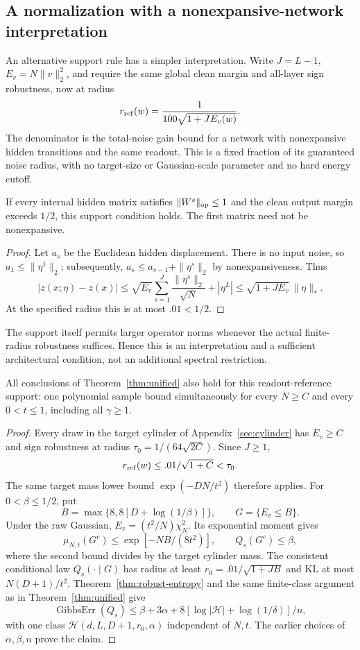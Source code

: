 \subsection{A normalization with a nonexpansive-network interpretation}
\label{sec:readout-reference}

An alternative support rule has a simpler interpretation. Write $J=L-1$,
$E_v=N\|v\|_2^2$, and require the same global clean margin and all-layer
sign robustness, now at radius
\[
 r_{\rm ref}(w)=\frac{1}{100\sqrt{1+J E_v(w)}}.
\]
The denominator is the total-noise gain bound for a network with
nonexpansive hidden transitions and the same readout. This is a fixed
fraction of its guaranteed noise radius, with no target-size or Gaussian-scale
parameter and no hard energy cutoff.

\begin{proposition}\label{prop:nonexpansive-reference}
If every internal hidden matrix satisfies $\|W^s\|_{\mathrm{op}}\le1$ and the
clean output margin exceeds $1/2$, this support condition holds.
The first matrix need not be nonexpansive.
\end{proposition}
\begin{proof}
Let $a_s$ be the Euclidean hidden displacement. There is no input noise,
so $a_1\le\|\eta^1\|_2$; subsequently,
$a_s\le a_{s-1}+\|\eta^s\|_2$ by nonexpansiveness. Thus
\[
 |z(x;\eta)-z(x)|
 \le\sqrt{E_v}\sum_{s=1}^J\frac{\|\eta^s\|_2}{\sqrt N}+|\eta^L|
 \le\sqrt{1+JE_v}\,\|\eta\|_*.
\]
At the specified radius this is at most $.01<1/2$.
\end{proof}

The support itself permits larger operator norms whenever the actual
finite-radius robustness suffices. Hence this is an interpretation and a
sufficient architectural condition, not an additional spectral restriction.

\begin{corollary}\label{cor:readout-reference}
All conclusions of Theorem~\ref{thm:unified} also hold for this
readout-reference support: one polynomial sample bound simultaneously for
every $N\ge C$ and every $0<t\le1$, including all $\gamma\ge1$.
\end{corollary}
\begin{proof}
Every draw in the target cylinder of Appendix~\ref{sec:cylinder} has
$E_v\ge C$ and sign robustness at radius $\tau_0=1/(64\sqrt{2C})$.
Since $J\ge1$,
\[
 r_{\rm ref}(w)\le .01/\sqrt{1+C}<\tau_0.
\]
The same target mass lower bound $\exp(-DN/t^2)$ therefore applies.
For $0<\beta\le1/2$, put
\[
 B=\max\{8,8[D+\log(1/\beta)]\},\qquad G=\{E_v\le B\}.
\]
Under the raw Gaussian, $E_v=(t^2/N)\chi_N^2$. Its exponential moment gives
\[
 \mu_{N,t}(G^c)\le\exp[-NB/(8t^2)],\qquad Q_s(G^c)\le\beta,
\]
where the second bound divides by the target cylinder mass.
The consistent conditional law $Q_s(\cdot\mid G)$ has radius at least
$r_0=.01/\sqrt{1+JB}$ and KL at most $N(D+1)/t^2$.
Theorem~\ref{thm:robust-entropy} and the same finite-class argument as in
Theorem~\ref{thm:unified} give
\[
 \operatorname{GibbsErr}(Q_s)
 \le\beta+3\alpha+8[\log|\mathcal H|+\log(1/\delta)]/n,
\]
with one class $\mathcal H(d,L,D+1,r_0,\alpha)$ independent of $N,t$.
The earlier choices of $\alpha,\beta,n$ prove the claim.
\end{proof}

